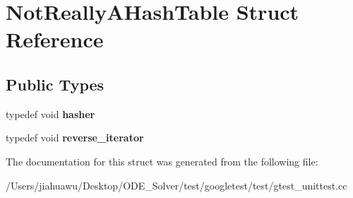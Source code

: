 \hypertarget{struct_not_really_a_hash_table}{}\section{Not\+Really\+A\+Hash\+Table Struct Reference}
\label{struct_not_really_a_hash_table}
\subsection*{Public Types}
\begin{DoxyCompactItemize}
\item 
\mbox{\label{struct_not_really_a_hash_table_a0206bef6150919c8ba5d539d5bf555f7}} 
typedef void {\bfseries hasher}
\item 
\mbox{\label{struct_not_really_a_hash_table_a8dbee2a2a80768191c736fb57367cfe7}} 
typedef void {\bfseries reverse\+\_\+iterator}
\end{DoxyCompactItemize}


The documentation for this struct was generated from the following file\+:\begin{DoxyCompactItemize}
\item 
/\+Users/jiahuawu/\+Desktop/\+O\+D\+E\+\_\+\+Solver/test/googletest/test/gtest\+\_\+unittest.\+cc\end{DoxyCompactItemize}
